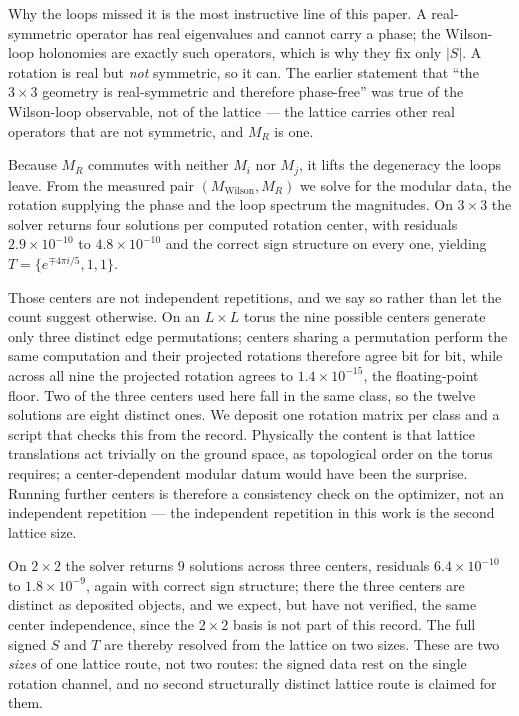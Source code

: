 \documentclass[aps,pra,twocolumn,superscriptaddress,longbibliography,floatfix,nofootinbib]{revtex4-2}
\begin{document}
Why the loops missed it is the most instructive line of this paper. A
real-symmetric operator has real eigenvalues and cannot carry a phase; the
Wilson-loop holonomies are exactly such operators, which is why they fix only
$|S|$. A rotation is real but \emph{not} symmetric, so it can. The earlier
statement that ``the $3\times3$ geometry is real-symmetric and therefore
phase-free'' was true of the Wilson-loop observable, not of the lattice --- the
lattice carries other real operators that are not symmetric, and $M_R$ is one.

Because $M_R$ commutes with neither $M_i$ nor $M_j$, it lifts the degeneracy
the loops leave. From the measured pair $(M_{\mathrm{Wilson}},M_R)$ we solve for
the modular data, the rotation supplying the phase and the loop spectrum the
magnitudes. On $3\times3$ the solver returns four solutions per computed
rotation center, with residuals $2.9\times10^{-10}$ to $4.8\times10^{-10}$ and
the correct sign structure on every one, yielding $T=\{e^{\mp4\pi i/5},1,1\}$.

Those centers are not independent repetitions, and we say so rather than let
the count suggest otherwise. On an $L\times L$ torus the nine possible centers
generate only three distinct edge permutations; centers sharing a permutation
perform the same computation and their projected rotations therefore agree bit
for bit, while across all nine the projected rotation agrees to
$1.4\times10^{-15}$, the floating-point floor. Two of the three centers used
here fall in the same class, so the twelve solutions are eight distinct ones.
We deposit one rotation matrix per class and a script that checks this from the
record. Physically the content is that lattice translations act trivially on
the ground space, as topological order on the torus requires; a
center-dependent modular datum would have been the surprise. Running further
centers is therefore a consistency check on the optimizer, not an independent
repetition --- the independent repetition in this work is the second lattice
size.

On $2\times2$ the solver returns $9$ solutions across three centers, residuals
$6.4\times10^{-10}$ to $1.8\times10^{-9}$, again with correct sign structure;
there the three centers are distinct as deposited objects, and we expect, but
have not verified, the same center independence, since the $2\times2$ basis is
not part of this record. The full signed $S$ and $T$ are thereby resolved from
the lattice on two sizes. These are two \emph{sizes} of one lattice route, not
two routes: the signed data rest on the single rotation channel, and no second
structurally distinct lattice route is claimed for them.
\end{document}
